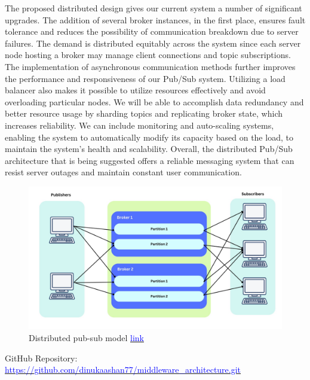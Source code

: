 \documentclass[12pt]{article}
\begin{document}
The proposed distributed design gives our current system a number of significant upgrades. The addition of several broker instances, in the first place, ensures fault tolerance and reduces the possibility of communication breakdown due to server failures. The demand is distributed equitably across the system since each server node hosting a broker may manage client connections and topic subscriptions. The implementation of asynchronous communication methods further improves the performance and responsiveness of our Pub/Sub system. Utilizing a load balancer also makes it possible to utilize resources effectively and avoid overloading particular nodes. We will be able to accomplish data redundancy and better resource usage by sharding topics and replicating broker state, which increases reliability. We can include monitoring and auto-scaling systems, enabling the system to automatically modify its capacity based on the load, to maintain the system's health and scalability. Overall, the distributed Pub/Sub architecture that is being suggested offers a reliable messaging system that can resist server outages and maintain constant user communication. \\

\begin{figure}[htbp]
    \centering
    \includegraphics[width=\textwidth]{diagram.jpeg}
    \caption{Distributed pub-sub model \href{https://drive.google.com/file/d/1Fb0DC_PNNx6Xuwt2y6slLfDzqltXbMOb/view?usp=sharing}{\textcolor{blue}{link}}}
    \label{fig:sample}
\end{figure}

\noindent
GitHub Repository: \href{https://github.com/dinukaashan77/middleware_architecture.git}{\textcolor{blue}{https://github.com/dinukaashan77/middleware\_architecture.git}}
\end{document}
